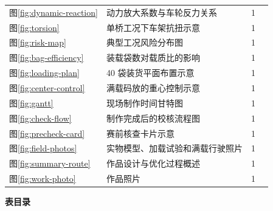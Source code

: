 \documentclass[UTF8,a4paper,12pt,fontset=none]{ctexart}
\numberwithin{equation}{section}
\numberwithin{figure}{section}
\numberwithin{table}{section}
\newcommand{\catalogtitle}[1]{%
  \begin{center}
    {\heiti\bfseries\zihao{4} #1}
  \end{center}
  \vspace{-0.4em}
}
\begin{document}
{\begin{longtable}{@{}C{1.8cm}L{8.7cm}C{1.4cm}C{1.4cm}@{}}
图\ref{fig:dynamic-reaction} & 动力放大系数与车轮反力关系 & 1 & \pageref{fig:dynamic-reaction} \\
图\ref{fig:torsion} & 单桥工况下车架抗扭示意 & 1 & \pageref{fig:torsion} \\
图\ref{fig:risk-map} & 典型工况风险分布图 & 1 & \pageref{fig:risk-map} \\
图\ref{fig:bag-efficiency} & 装载袋数对载质比的影响 & 1 & \pageref{fig:bag-efficiency} \\
图\ref{fig:loading-plan} & 40 袋装货平面布置示意 & 1 & \pageref{fig:loading-plan} \\
图\ref{fig:center-control} & 满载码放的重心控制示意 & 1 & \pageref{fig:center-control} \\
图\ref{fig:gantt} & 现场制作时间甘特图 & 1 & \pageref{fig:gantt} \\
图\ref{fig:check-flow} & 制作完成后的校核流程图 & 1 & \pageref{fig:check-flow} \\
图\ref{fig:precheck-card} & 赛前核查卡片示意 & 1 & \pageref{fig:precheck-card} \\
图\ref{fig:field-photos} & 实物模型、加载试验和满载行驶照片 & 1 & \pageref{fig:field-photos} \\
图\ref{fig:summary-route} & 作品设计与优化过程概述 & 1 & \pageref{fig:summary-route} \\
图\ref{fig:work-photo} & 作品照片 & 1 & \pageref{fig:work-photo} \\
\bottomrule
\end{longtable}
}
\newpage
{}
{}
\catalogtitle{表目录}
\end{document}
